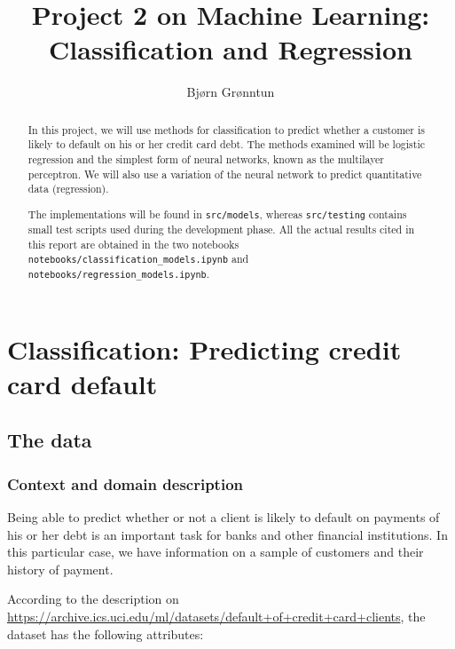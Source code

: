 \documentclass{article}
\title{Project 2 on Machine Learning: Classification and Regression}
\author{Bj{\o}rn Gr{\o}nntun}
\begin{document}
\maketitle

\begin{abstract}
In this project, we will use methods for classification to predict whether a customer is likely to default on his or her credit card debt. The methods examined will be logistic regression and the simplest form of neural networks, known as the multilayer perceptron. We will also use a variation of the neural network to predict quantitative data (regression).

The implementations will be found in \texttt{src/models}, whereas \texttt{src/testing} contains small test scripts used during the development phase. All the actual results cited in this report are obtained in the two notebooks \texttt{notebooks/classification\_models.ipynb} and \texttt{notebooks/regression\_models.ipynb}.
\end{abstract}

\section{Classification: Predicting credit card default}
\subsection{The data}
\subsubsection{Context and domain description}
Being able to predict whether or not a client is likely to default on payments of his or her debt is an important task for banks and other financial institutions. In this particular case, we have information on a sample of customers and their history of payment.

According to the description on \url{https://archive.ics.uci.edu/ml/datasets/default+of+credit+card+clients}, the dataset has the following attributes:
\end{document}
